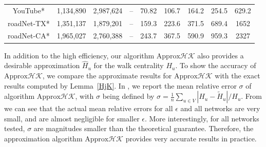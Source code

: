 \documentclass[10pt,twocolumn,twoside]{IEEEtran}
\begin{document}
\begin{table}[htbp]
\begin{threeparttable}
\begin{tabular}{crrcccccc}
            YouTube*                                      & 1,134,890 & 2,987,624 & --      & 70.82   & 106.7    & 164.2   & 254.5    & 629.2   \\
            roadNet-TX*                                   & 1,351,137 & 1,879,201 & --      & 159.3   & 223.6    & 371.5   & 689.4    & 1652    \\
            roadNet-CA*                                   & 1,965,027 & 2,760,388 & --      & 243.7   & 367.5    & 590.9   & 959.3    & 2327    \\
            \bottomrule
        \end{tabular}
    \end{threeparttable}
\end{table}

In addition to the high efficiency,  our algorithm  \(\text{Approx}\mathcal{HK}\) also provides a desirable approximation \(\hat{H}_u\) for the walk centrality \(H_u\).   To show the accuracy of   \(\text{Approx}\mathcal{HK}\), we compare the  approximate  results for \(\text{Approx}\mathcal{HK}\) with the exact results computed by  Lemma~\ref{HjK}. In , we report the mean relative error \(\sigma\) of algorithm  \(\text{Approx}\mathcal{HK}\), with \(\sigma\) being defined by \(\sigma=\frac{1}{n}\sum_{u\in V}|{H_u}-\tilde{H}_u|/{H_u}\). From   we can see that  the actual mean relative errors for all \(\epsilon\) and all networks are  very small, and are almost negligible for smaller \(\epsilon\). More interestingly, for all networks tested,   \(\sigma\) are magnitudes smaller than the theoretical guarantee. Therefore, the  approximation algorithm  \(\text{Approx}\mathcal{HK}\) provides very accurate results in practice.
\end{document}
